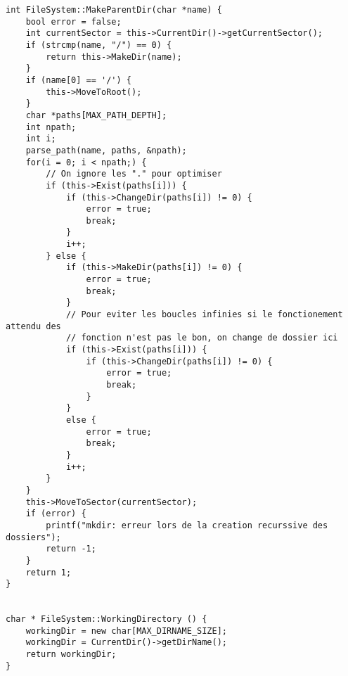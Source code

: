 \documentclass[a4paper,10pt]{article}
\begin{document}
\begin{lstlisting}
int FileSystem::MakeParentDir(char *name) {
    bool error = false;
    int currentSector = this->CurrentDir()->getCurrentSector();
    if (strcmp(name, "/") == 0) {
        return this->MakeDir(name);
    }
    if (name[0] == '/') {
        this->MoveToRoot();
    }
    char *paths[MAX_PATH_DEPTH];
    int npath;
    int i;
    parse_path(name, paths, &npath);
    for(i = 0; i < npath;) {
        // On ignore les "." pour optimiser
        if (this->Exist(paths[i])) {
            if (this->ChangeDir(paths[i]) != 0) {
                error = true;
                break;
            }
            i++;
        } else {
            if (this->MakeDir(paths[i]) != 0) {
                error = true;
                break;
            }
            // Pour eviter les boucles infinies si le fonctionement attendu des
            // fonction n'est pas le bon, on change de dossier ici
            if (this->Exist(paths[i])) {
                if (this->ChangeDir(paths[i]) != 0) {
                    error = true;
                    break;
                }
            }
            else {
                error = true;
                break;
            }
            i++;
        }
    }
    this->MoveToSector(currentSector);
    if (error) {
        printf("mkdir: erreur lors de la creation recurssive des dossiers");
        return -1;
    }
    return 1;
}


char * FileSystem::WorkingDirectory () {
    workingDir = new char[MAX_DIRNAME_SIZE];
    workingDir = CurrentDir()->getDirName();
    return workingDir;
}
\end{lstlisting}
\end{document}
